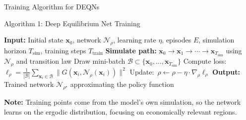 \documentclass[aspectratio=169,11pt]{beamer}
\newcommand{\emphc}[1]{\textcolor{harvardcrimson}{#1}}
\newcommand{\x}{\bm{x}}
\begin{document}
\begin{frame}{Training Algorithm for DEQNs}
\begin{block}{Algorithm 1: Deep Equilibrium Net Training}
\begin{algorithmic}
\footnotesize
\STATE \textbf{Input:} Initial state $\x_0$, network $\mathcal{N}_\rho$, learning rate $\eta$, episodes $E$, simulation horizon $T_{\mathrm{sim}}$, training steps $T_{\mathrm{train}}$
    \STATE \textbf{Simulate path:} $\x_0 \to \x_1 \to \cdots \to \x_{T_{\mathrm{sim}}}$ using $\mathcal{N}_\rho$ and transition law
        \STATE Draw mini-batch $\mathcal{B} \subset \{\x_0, \ldots, \x_{T_{\mathrm{sim}}}\}$
        \STATE Compute loss:~$\ell_\rho = \frac{1}{|\mathcal{B}|}\sum_{\x_i \in \mathcal{B}} \|G(\x_i, \mathcal{N}_\rho(\x_i))\|^2$
        \STATE Update:~$\rho \leftarrow \rho - \eta \cdot \nabla_\rho \ell_\rho$
    \ENDFOR
\ENDFOR
\STATE \textbf{Output:} Trained network $\mathcal{N}_{\rho^\star}$ approximating the policy function
\end{algorithmic}
\end{block}

\vspace{0.2em}
{\small \textbf{Note:} Training points come from the \emphc{model's own simulation}, so the network learns on the ergodic distribution, focusing on economically relevant regions.}
\end{frame}
\end{document}

